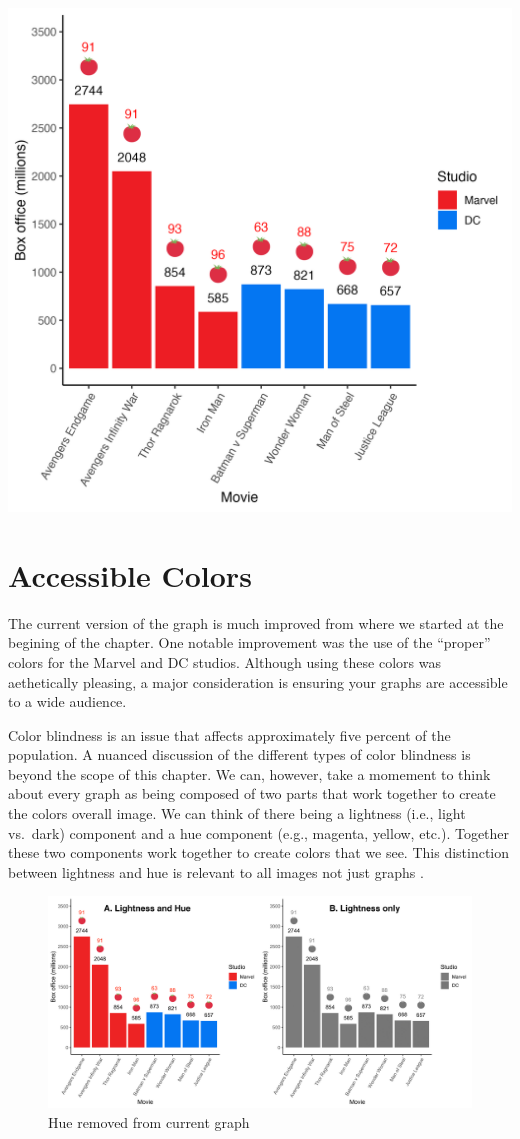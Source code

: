 \documentclass[
]{krantz}
\begin{document}
\includegraphics[width=0.65\linewidth]{ch_graphing/images/emoji_graph}

\hypertarget{accessible-colors}{%
\section{Accessible Colors}\label{accessible-colors}}

The current version of the graph is much improved from where we started at the begining of the chapter. One notable improvement was the use of the ``proper'' colors for the Marvel and DC studios. Although using these colors was aethetically pleasing, a major consideration is ensuring your graphs are accessible to a wide audience.

Color blindness is an issue that affects approximately five percent of the population. A nuanced discussion of the different types of color blindness is beyond the scope of this chapter. We can, however, take a momement to think about every graph as being composed of two parts that work together to create the colors overall image. We can think of there being a lightness (i.e., light vs.~dark) component and a hue component (e.g., magenta, yellow, etc.). Together these two components work together to create colors that we see. This distinction between lightness and hue is relevant to all images not just graphs \citep[see][]{margulis2005photoshop}.

\begin{figure}
\includegraphics[width=0.75\linewidth]{ch_graphing/images/nocolorcomparison} \caption{Hue removed from current graph}\label{fig:colorcomparison}
\end{figure}
\end{document}

